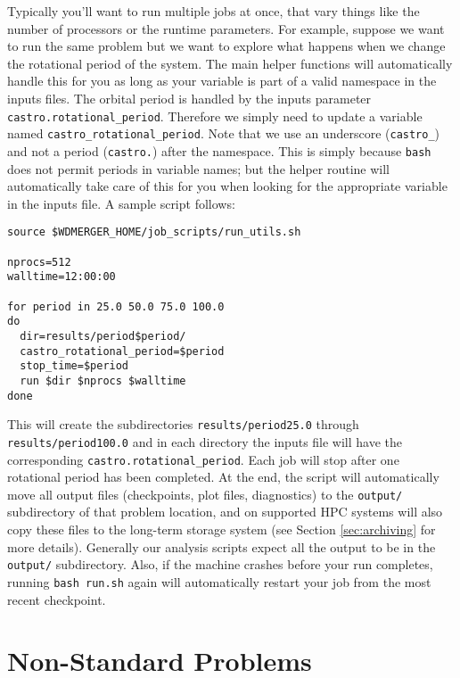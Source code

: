\documentclass[12pt]{book}
\begin{document}
Typically you'll want to run multiple jobs at once, that vary things like the number of processors 
or the runtime parameters. For example, suppose we want to run the same problem but we want to 
explore what happens when we change the rotational period of the system. The main helper functions 
will automatically handle this for you as long as your variable is part of a valid namespace in the inputs files.
The orbital period is handled by the inputs parameter \texttt{castro.rotational\_period}. Therefore 
we simply need to update a variable named \texttt{castro\_rotational\_period}. 
Note that we use an underscore (\texttt{castro\_}) and not a period (\texttt{castro.}) after the namespace.
This is simply because \texttt{bash} does not permit periods in variable names; but the helper routine will 
automatically take care of this for you when looking for the appropriate variable in the inputs file.
A sample script follows:

\begin{lstlisting}
source $WDMERGER_HOME/job_scripts/run_utils.sh

nprocs=512
walltime=12:00:00

for period in 25.0 50.0 75.0 100.0
do
  dir=results/period$period/
  castro_rotational_period=$period
  stop_time=$period
  run $dir $nprocs $walltime
done
\end{lstlisting}%
This will create the subdirectories \texttt{results/period25.0} through \texttt{results/period100.0}
and in each directory the inputs file will have the corresponding \texttt{castro.rotational\_period}.
Each job will stop after one rotational period has been completed. At the end, the script will automatically move all 
output files (checkpoints, plot files, diagnostics)
to the \texttt{output/} subdirectory of that problem location, and on supported HPC systems will also copy these 
files to the long-term storage system (see Section \ref{sec:archiving} for more details). 
Generally our analysis scripts expect all the output to be in the 
\texttt{output/} subdirectory. Also, if the machine crashes before your run completes, running \texttt{bash run.sh}
again will automatically restart your job from the most recent checkpoint.

\section{Non-Standard Problems}
\label{sec:non-standard_problems}
\end{document}
